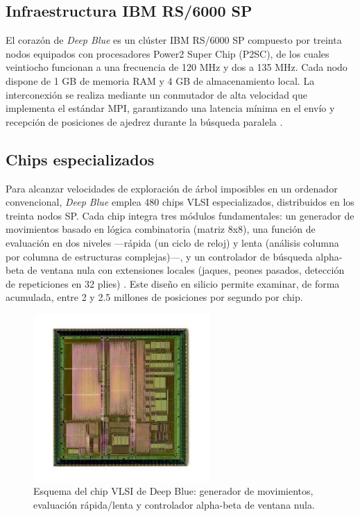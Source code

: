 \documentclass[a4paper, 12pt]{article}
\begin{document}
\subsection{Infraestructura IBM RS/6000 SP}

El corazón de \textit{Deep Blue} es un clúster IBM RS/6000 SP 
compuesto por treinta nodos equipados con procesadores Power2 
Super Chip (P2SC), de los cuales veintiocho funcionan a una 
frecuencia de 120 MHz y dos a 135 MHz. Cada nodo dispone de 1 GB 
de memoria RAM y 4 GB de almacenamiento local. La interconexión 
se realiza mediante un conmutador de alta velocidad que 
implementa el estándar MPI, garantizando una latencia mínima en 
el envío y recepción de posiciones de ajedrez durante la 
búsqueda paralela \cite{campbell2002deep, hsu1999ibm}.

\subsection{Chips especializados}

Para alcanzar velocidades de exploración de árbol imposibles en 
un ordenador convencional, \textit{Deep Blue} emplea 480 chips 
VLSI especializados, distribuidos en los treinta nodos SP. Cada 
chip integra tres módulos fundamentales: un generador de 
movimientos basado en lógica combinatoria (matriz 8x8), una 
función de evaluación en dos niveles —rápida (un ciclo de reloj) 
y lenta (análisis columna por columna de estructuras complejas)—, 
y un controlador de búsqueda alpha-beta de ventana nula con 
extensiones locales (jaques, peones pasados, detección de 
repeticiones en 32 plies) \cite{campbell2002deep}. Este diseño en 
silicio permite examinar, de forma acumulada, entre 2 y 2.5 
millones de posiciones por segundo por chip. \cite{hsu1999ibm}

\begin{figure}[h]
    \centering
    \includegraphics[width=0.6\textwidth]{assets/deep-blue-chip.jpg}
    \caption{Esquema del chip VLSI de Deep Blue: generador de movimientos, evaluación rápida/lenta y controlador alpha-beta de ventana nula.}
    \label{fig:chip_vlsi}
\end{figure}
\end{document}
